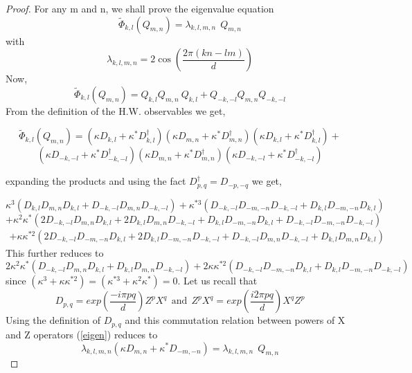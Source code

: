 \documentclass[12pt]{amsart}
\numberwithin{equation}{section}
\begin{document}
 \begin{proof}
     For any m and n, we shall prove the eigenvalue equation
     \[\tilde{\Phi}_{k,l} (Q_{m,n})= \lambda_{k,l,m,n} ~~Q_{m,n}\] with \[\lambda_{k,l,m,n}= 2  \cos\left( \frac{ 2 \pi (kn-lm)}{d}\right)\]
Now, \[\tilde{\Phi}_{k,l} (Q_{m,n})=Q_{k,l} Q_{m,n}~ Q_{k,l} + Q_{-k,-l} Q_{m,n} Q_{-k,-l} \]
From the definition of the H.W. observables we get, 

\[\tilde{\Phi}_{k,l} (Q_{m,n})=\left( \kappa D_{k,l}+\kappa^* D^{\dagger}_{k,l}\right)\left( \kappa D_{m,n}+\kappa^* D^{\dagger}_{m,n}\right)\left( \kappa D_{k,l}+\kappa^* D^{\dagger}_{k,l}\right)+\]\[\left( \kappa D_{-k,-l}+\kappa^* D^{\dagger}_{-k,-l}\right)\left( \kappa D_{m,n}+\kappa^* D^{\dagger}_{m,n}\right)\left( \kappa D_{-k,-l}+\kappa^* D^{\dagger}_{-k,-l}\right)\]

expanding the products and using the fact 
$D_{p,q}^{\dagger}=D_{-p,-q}$ we get,


\[\kappa^3 \left( D_{k,l}D_{m,n}D_{k,l}+D_{-k,-l}D_{m,n}D_{-k,-l}\right) + \kappa^{*3} \left( D_{-k,-l}D_{-m,-n}D_{-k,-l}+D_{k,l}D_{-m,-n}D_{k,l}\right) \]
\[+\kappa^2\kappa^* \left( 2 D_{-k,-l}D_{m,n}D_{k,l}+2 D_{k,l}D_{m,n}D_{-k,-l}+D_{k,l}D_{-m,-n}D_{k,l}+D_{-k,-l}D_{-m,-n}D_{-k,-l}\right)\]
\begin{eqnarray*}
   + \kappa \kappa^{*2}\left( 2 D_{-k,-l}D_{-m,-n}D_{k,l}+2 D_{k,l}D_{-m,-n}D_{-k,-l}+D_{-k,-l}D_{m,n}D_{-k,-l}+D_{k,l}D_{m,n}D_{k,l} \right)
\end{eqnarray*}
This further reduces to 
\begin{equation}\label{eigen}
    2 \kappa^2\kappa^* \left(  D_{-k,-l}D_{m,n}D_{k,l}+ D_{k,l}D_{m,n}D_{-k,-l}\right)+2 \kappa \kappa^{*2}\left(  D_{-k,-l}D_{-m,-n}D_{k,l}+ D_{k,l}D_{-m,-n}D_{-k,-l}\right)
\end{equation}
     since $\left(\kappa^3+\kappa \kappa^{*2} \right)=\left(\kappa^{*3}+\kappa^2 \kappa^{*} \right)=0$. Let us recall that \[D_{p,q}=exp\left(\frac{-i \pi p q}{d}\right) Z^p X^q ~~\text{and}~~Z^pX^q=exp\left(\frac{i 2 \pi p q}{d}\right) X^qZ^p\]
     Using the definition of $D_{p,q}$ and this commutation relation between powers of X and Z operators (\ref{eigen}) reduces to 
     \[\lambda_{k,l,m,n} \left(\kappa D_{m,n}+\kappa^* D_{-m,-n}\right)= \lambda_{k,l,m,n}~~ Q_{m,n}\]
     
 \end{proof}
 
 
 
\end{document}
